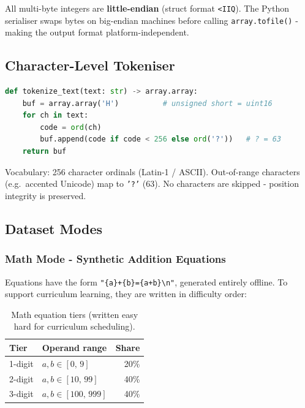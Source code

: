 \documentclass[12pt, a4paper]{article}
\begin{document}
All multi-byte integers are \textbf{little-endian} (struct format \texttt{<IIQ}).
The Python serialiser swaps bytes on big-endian machines before calling
\texttt{array.tofile()} - making the output format platform-independent.

\subsection{Character-Level Tokeniser}

\begin{tcolorbox}[codebox, title={Tokeniser design}]
\begin{lstlisting}[language=Python]
def tokenize_text(text: str) -> array.array:
    buf = array.array('H')          # unsigned short = uint16
    for ch in text:
        code = ord(ch)
        buf.append(code if code < 256 else ord('?'))   # ? = 63
    return buf
\end{lstlisting}
Vocabulary: 256 character ordinals (Latin-1 / ASCII).
Out-of-range characters (e.g.\ accented Unicode) map to \texttt{'?'} (63).
No characters are skipped - position integrity is preserved.
\end{tcolorbox}

\subsection{Dataset Modes}

\subsubsection{Math Mode - Synthetic Addition Equations}

Equations have the form \texttt{"\{a\}+\{b\}=\{a+b\}{\textbackslash}n"}, generated entirely offline.
To support curriculum learning, they are written in difficulty order:

\begin{table}[!ht]
\centering
\renewcommand{\arraystretch}{1.25}
\begin{tabular}{@{} l l r @{}}
\toprule
Tier & Operand range & Share \\
\midrule
1-digit  & \(a, b \in [0,\, 9]\)     & 20\% \\
2-digit  & \(a, b \in [10,\, 99]\)   & 40\% \\
3-digit  & \(a, b \in [100,\, 999]\) & 40\% \\
\bottomrule
\end{tabular}
\caption{Math equation tiers (written easy  hard for curriculum scheduling).}
\end{table}
\end{document}
